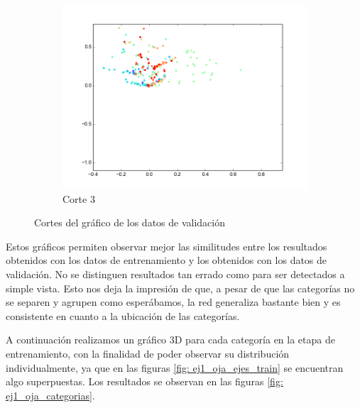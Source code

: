 \begin{figure}[H]
\begin{subfigure}[b]{0.33\textwidth}
                \includegraphics[width=\linewidth]{secciones/graficos/oja/eje3_valid.png}
                \caption{Corte 3}
                \label{fig: ej1_oja_eje_3_valid}
        \end{subfigure}
        \caption{Cortes del gráfico de los datos de validación}
        \label{fig: ej1_oja_ejes_valid}
\end{figure}


\par Estos gráficos permiten observar mejor las similitudes entre los resultados obtenidos con los datos de entrenamiento y los obtenidos con los datos de validación. No se distinguen resultados tan errado como para ser detectados a simple vista. Esto nos deja la impresión de que, a pesar de que las categorías no se separen y agrupen como esperábamos, la red generaliza bastante bien y es consistente en cuanto a la ubicación de las categorías.

\par A continuación realizamos un gráfico 3D para cada categoría en la etapa de entrenamiento, con la finalidad de poder observar su distribución individualmente, ya que en las figuras \ref{fig: ej1_oja_ejes_train} se encuentran algo superpuestas. Los resultados se observan en las figuras \ref{fig: ej1_oja_categorias}.


